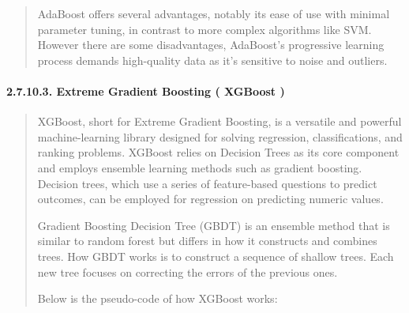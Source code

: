 \documentclass[
]{article}
\begin{document}
\begin{quote}
AdaBoost offers several advantages, notably its ease of use with minimal
parameter tuning, in contrast to more complex algorithms like SVM.
However there are some disadvantages, AdaBoost's progressive learning
process demands high-quality data as it's sensitive to noise and
outliers.
\end{quote}

\hypertarget{extreme-gradient-boosting-xgboost}{%
\paragraph{\texorpdfstring{\textbf{2.7.10.3. Extreme Gradient Boosting (
XGBoost
)}}{2.7.10.3. Extreme Gradient Boosting ( XGBoost )}}\label{extreme-gradient-boosting-xgboost}}

\begin{quote}
XGBoost, short for Extreme Gradient Boosting, is a versatile and
powerful machine-learning library designed for solving regression,
classifications, and ranking problems. XGBoost relies on Decision Trees
as its core component and employs ensemble learning methods such as
gradient boosting. Decision trees, which use a series of feature-based
questions to predict outcomes, can be employed for regression on
predicting numeric values.

Gradient Boosting Decision Tree (GBDT) is an ensemble method that is
similar to random forest but differs in how it constructs and combines
trees. How GBDT works is to construct a sequence of shallow trees. Each
new tree focuses on correcting the errors of the previous ones.

Below is the pseudo-code of how XGBoost works:
\end{quote}
\end{document}
